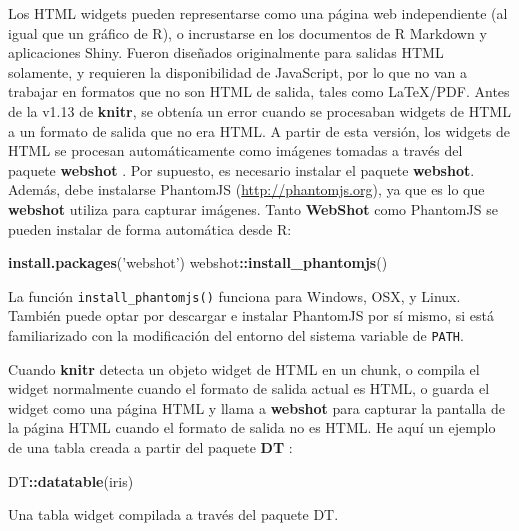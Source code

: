 \documentclass[12pt,]{krantz}
\makeatletter
\newenvironment{Shaded}{\begin{snugshade}}{\end{snugshade}}
\newcommand{\KeywordTok}[1]{\textcolor[rgb]{0.13,0.29,0.53}{\textbf{#1}}}
\newcommand{\StringTok}[1]{\textcolor[rgb]{0.31,0.60,0.02}{#1}}
\newcommand{\OperatorTok}[1]{\textcolor[rgb]{0.81,0.36,0.00}{\textbf{#1}}}
\newcommand{\NormalTok}[1]{#1}
\newenvironment{kframe}{%
\medskip{}
\setlength{\fboxsep}{.8em}
 \def\at@end@of@kframe{}%
 \ifinner\ifhmode%
  \def\at@end@of@kframe{\end{minipage}}%
  \begin{minipage}{\columnwidth}%
 \fi\fi%
 \def\FrameCommand##1{\hskip\@totalleftmargin \hskip-\fboxsep
 \colorbox{shadecolor}{##1}\hskip-\fboxsep
     \hskip-\linewidth \hskip-\@totalleftmargin \hskip\columnwidth}%
 \MakeFramed {\advance\hsize-\width
   \@totalleftmargin\z@ \linewidth\hsize
   \@setminipage}}%
 {\par\unskip\endMakeFramed%
 \at@end@of@kframe}
\renewenvironment{Shaded}{\begin{kframe}}{\end{kframe}}
\theoremstyle{definition}
\theoremstyle{definition}
\theoremstyle{definition}
\theoremstyle{remark}
\makeatother
\begin{document}
Los HTML widgets pueden representarse como una página web independiente
(al igual que un gráfico de R), o incrustarse en los documentos de R
Markdown y aplicaciones Shiny. Fueron diseñados originalmente para
salidas HTML solamente, y requieren la disponibilidad de JavaScript, por
lo que no van a trabajar en formatos que no son HTML de salida, tales
como LaTeX/PDF. Antes de la v1.13 de \textbf{knitr}, se obtenía un error
cuando se procesaban widgets de HTML a un formato de salida que no era
HTML. A partir de esta versión, los widgets de HTML se procesan
automáticamente como imágenes tomadas a través del paquete
\textbf{webshot} \citep{R-webshot}. Por supuesto, es necesario instalar
el paquete \textbf{webshot}. Además, debe instalarse PhantomJS
(\url{http://phantomjs.org}), ya que es lo que \textbf{webshot} utiliza
para capturar imágenes. Tanto \textbf{WebShot} como PhantomJS se pueden
instalar de forma automática desde R:

\begin{Shaded}
\begin{Highlighting}[]
\KeywordTok{install.packages}\NormalTok{(}\StringTok{'webshot'}\NormalTok{)}
\NormalTok{webshot}\OperatorTok{::}\KeywordTok{install_phantomjs}\NormalTok{()}
\end{Highlighting}
\end{Shaded}

La función \texttt{install\_phantomjs()} funciona para Windows, OSX, y
Linux. También puede optar por descargar e instalar PhantomJS por sí
mismo, si está familiarizado con la modificación del entorno del sistema
variable de \texttt{PATH}.

Cuando \textbf{knitr} detecta un objeto widget de HTML en un chunk, o
compila el widget normalmente cuando el formato de salida actual es
HTML, o guarda el widget como una página HTML y llama a \textbf{webshot}
para capturar la pantalla de la página HTML cuando el formato de salida
no es HTML. He aquí un ejemplo de una tabla creada a partir del paquete
\textbf{DT} \citep{R-DT}:

\begin{Shaded}
\begin{Highlighting}[]
\NormalTok{DT}\OperatorTok{::}\KeywordTok{datatable}\NormalTok{(iris)}
\end{Highlighting}
\end{Shaded}

\hypertarget{htmlwidget-e1294e847e7b96ffa195}{}

\label{fig:DT-demo}Una tabla widget compilada a través del paquete DT.
\end{document}
